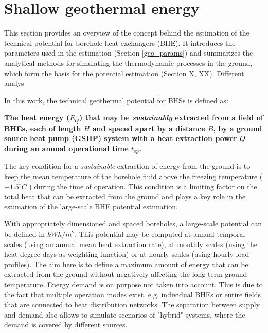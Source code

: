 \begin{comment}
\subsection{Solar thermal heat generation}

The computation of the technical potential of a solar thermal collector is more complex to compute, as the solar thermal collector is typically coupled with a heat pump and a hot water tank. In the thermal application, the temperature of the collector and the ambience also play a larger role. Some studies still consider a constant efficiency value [27], while several studies suggest to consider temperature and incident irradiance [11], [28], [29].
\end{comment}

\section{Shallow geothermal energy}
\label{geo_method}

This section provides an overview of the concept behind the estimation of the technical potential for borehole heat exchangers (BHE). It introduces the parameters used in the estimation (Section \ref{geo_params}) and summarizes the analytical methods for simulating the thermodynamic processes in the ground, which form the basis for the potential estimation (Section X, XX). Different analys

In this work, the technical geothermal potential for BHSs is defined as:

\textbf{The heat energy ($E_Q$) that may be \textit{sustainably} extracted from a field of BHEs, each of length $H$ and spaced apart by a distance $B$, by a ground source heat pump (GSHP) system with a heat extraction power $Q$ during an annual operational time $t_{op}$. }

The key condition for a \textit{sustainable} extraction of energy from the ground is to keep the mean temperature of the borehole fluid above the freezing temperature ($-1.5^\circ C$ \citep{wagner_erdsondenpotenzial_2014}) during the time of operation. This condition is a limiting factor on the total heat that can be extracted from the ground and plays a key role in the estimation of the large-scale BHE potential estimation.

With appropriately dimensioned and spaced boreholes, a large-scale potential can be defined in $kWh/m^2$. This potential may be computed at annual temporal scales (using an annual mean heat extraction rate), at monthly scales (using the heat degree days as weighting function) or at hourly scales (using hourly load profiles).
The aim here is to define a maximum amount of energy that can be extracted from the ground without negatively affecting the long-term ground temperature. Energy demand is on purpose not taken into account. 
This is due to the fact that multiple operation modes exist, e.g. individual BHEs or entire fields that are connected to heat distribution networks. The separation between supply and demand also allows to simulate scenarios of "hybrid" systems, where the demand is covered by different sources.

